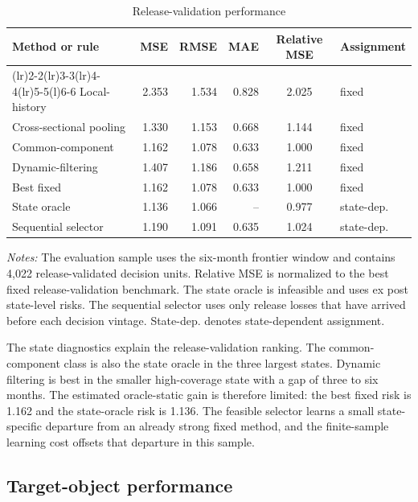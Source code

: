 \documentclass[a4paper, 12pt]{article}
\newcommand{\exhibitnote}[2][0.96\textwidth]{%
\vspace{0.65em}%
\begin{minipage}{#1}%
\footnotesize
\emph{Notes:} #2
\end{minipage}%
}
\theoremstyle{plain}
\theoremstyle{remark}
\newcommand{\1}{\mathbf{1}}
\begin{document}
\begin{table}[!htbp]
\centering
\caption{Release-validation performance}
\label{tab:fred_release_validation}
\small
\begin{tabular}{@{}>{\raggedright\arraybackslash}p{}rrrc>{\raggedleft\arraybackslash}p{}@{}}
\toprule
Method or rule & MSE & RMSE & MAE & Relative MSE & Assignment \\
\cmidrule(lr){1-1}\cmidrule(lr){2-2}\cmidrule(lr){3-3}\cmidrule(lr){4-4}\cmidrule(lr){5-5}\cmidrule(l){6-6}
Local-history & 2.353 & 1.534 & 0.828 & 2.025 & fixed \\
Cross-sectional pooling & 1.330 & 1.153 & 0.668 & 1.144 & fixed \\
Common-component & 1.162 & 1.078 & 0.633 & 1.000 & fixed \\
Dynamic-filtering & 1.407 & 1.186 & 0.658 & 1.211 & fixed \\
Best fixed & 1.162 & 1.078 & 0.633 & 1.000 & fixed \\
State oracle & 1.136 & 1.066 & -- & 0.977 & state-dep. \\
Sequential selector & 1.190 & 1.091 & 0.635 & 1.024 & state-dep. \\
\bottomrule
\end{tabular}
\exhibitnote{The evaluation sample uses the six-month frontier window and contains 4,022 release-validated decision units. Relative MSE is normalized to the best fixed release-validation benchmark. The state oracle is infeasible and uses ex post state-level risks. The sequential selector uses only release losses that have arrived before each decision vintage. State-dep. denotes state-dependent assignment.}
\end{table}

The state diagnostics explain the release-validation ranking. The common-component class is also the state oracle in the three largest states. Dynamic filtering is best in the smaller high-coverage state with a gap of three to six months. The estimated oracle-static gain is therefore limited: the best fixed risk is 1.162 and the state-oracle risk is 1.136. The feasible selector learns a small state-specific departure from an already strong fixed method, and the finite-sample learning cost offsets that departure in this sample.

\subsection{Target-object performance}
\label{subsec:fred-target-object}
\end{document}
